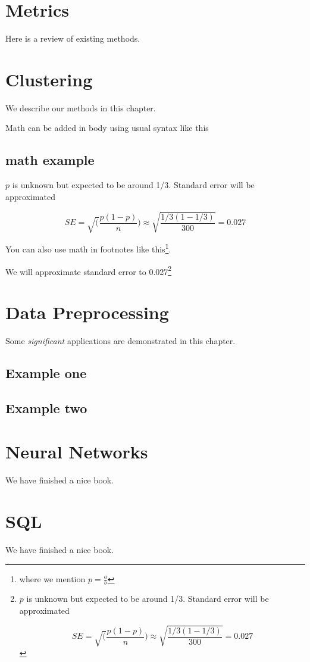 \documentclass[
]{book}
\begin{document}
\hypertarget{metrics}{%
\chapter{Metrics}\label{metrics}}

Here is a review of existing methods.

\hypertarget{clustering}{%
\chapter{Clustering}\label{clustering}}

We describe our methods in this chapter.

Math can be added in body using usual syntax like this

\hypertarget{math-example}{%
\section{math example}\label{math-example}}

\(p\) is unknown but expected to be around 1/3. Standard error will be approximated

\[
SE = \sqrt(\frac{p(1-p)}{n}) \approx \sqrt{\frac{1/3 (1 - 1/3)} {300}} = 0.027
\]

You can also use math in footnotes like this\footnote{where we mention \(p = \frac{a}{b}\)}.

We will approximate standard error to 0.027\footnote{\(p\) is unknown but expected to be around 1/3. Standard error will be approximated

  \[
  SE = \sqrt(\frac{p(1-p)}{n}) \approx \sqrt{\frac{1/3 (1 - 1/3)} {300}} = 0.027
  \]}

\hypertarget{data-preprocessing}{%
\chapter{Data Preprocessing}\label{data-preprocessing}}

Some \emph{significant} applications are demonstrated in this chapter.

\hypertarget{example-one}{%
\section{Example one}\label{example-one}}

\hypertarget{example-two}{%
\section{Example two}\label{example-two}}

\hypertarget{neural-networks}{%
\chapter{Neural Networks}\label{neural-networks}}

We have finished a nice book.

\hypertarget{sql}{%
\chapter{SQL}\label{sql}}

We have finished a nice book.

  
\end{document}
